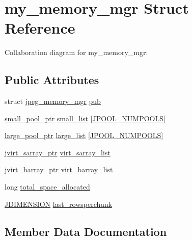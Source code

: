 \hypertarget{structmy__memory__mgr}{}\section{my\+\_\+memory\+\_\+mgr Struct Reference}
\label{structmy__memory__mgr}


Collaboration diagram for my\+\_\+memory\+\_\+mgr\+:
\subsection*{Public Attributes}
\begin{DoxyCompactItemize}
\item 
struct \hyperlink{structjpeg__memory__mgr}{jpeg\+\_\+memory\+\_\+mgr} \hyperlink{structmy__memory__mgr_a692dd77bfba8ab81c4f42643254d4528}{pub}
\item 
\hyperlink{jmemmgr_8c_a589d78516510f4b5a5d44e28debeab4d}{small\+\_\+pool\+\_\+ptr} \hyperlink{structmy__memory__mgr_a1c2bfaa346643520a2ff682c38e4ce0d}{small\+\_\+list} \mbox{[}\hyperlink{jpeglib_8h_a21147e3031a409bcc8d1ddfa5b2c53b5}{J\+P\+O\+O\+L\+\_\+\+N\+U\+M\+P\+O\+O\+L\+S}\mbox{]}
\item 
\hyperlink{jmemmgr_8c_a048418eab2b2022aaa4ec587c48a3089}{large\+\_\+pool\+\_\+ptr} \hyperlink{structmy__memory__mgr_af8257908eac43538230773374417739b}{large\+\_\+list} \mbox{[}\hyperlink{jpeglib_8h_a21147e3031a409bcc8d1ddfa5b2c53b5}{J\+P\+O\+O\+L\+\_\+\+N\+U\+M\+P\+O\+O\+L\+S}\mbox{]}
\item 
\hyperlink{jpeglib_8h_abc0b975077507c35b5a577e3ce9e4d91}{jvirt\+\_\+sarray\+\_\+ptr} \hyperlink{structmy__memory__mgr_ad613a2a2e52ac069c63fd083c9c91f04}{virt\+\_\+sarray\+\_\+list}
\item 
\hyperlink{jpeglib_8h_a994f4cba141d82ded90af38e51223f0b}{jvirt\+\_\+barray\+\_\+ptr} \hyperlink{structmy__memory__mgr_a09b8c66f15f14f1c3c247d98d6c81bbc}{virt\+\_\+barray\+\_\+list}
\item 
long \hyperlink{structmy__memory__mgr_acfcdee3e2d3e3d168e2a2aebe081535f}{total\+\_\+space\+\_\+allocated}
\item 
\hyperlink{jmorecfg_8h_a04ed4674f6f1d0d50ec241531e38274f}{J\+D\+I\+M\+E\+N\+S\+I\+O\+N} \hyperlink{structmy__memory__mgr_a7e30eb574b588f102f07d0ddb94d177d}{last\+\_\+rowsperchunk}
\end{DoxyCompactItemize}


\subsection{Member Data Documentation}
\hypertarget{structmy__memory__mgr_af8257908eac43538230773374417739b}{}
